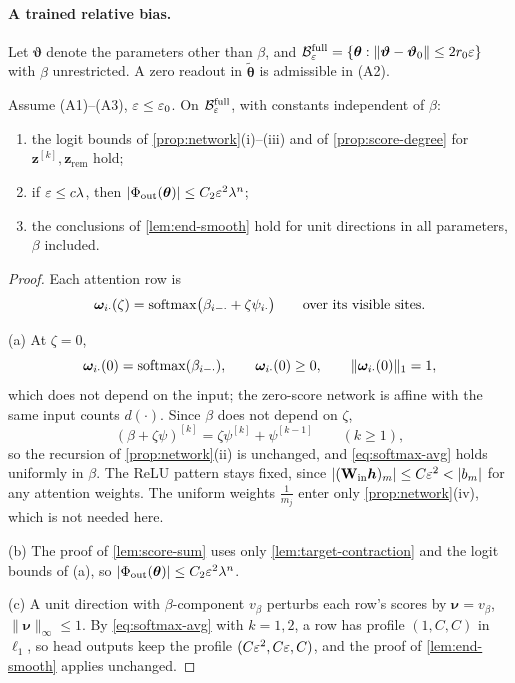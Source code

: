 \paragraph{A trained relative bias.} Let $\bm\vartheta$ denote the parameters other than $\beta$, and
$\mathcal B^{\mathrm{full}}_{\varepsilon}=\{\bm\theta:\|\bm\vartheta-\bm\vartheta_0\|\le2r_0\varepsilon\}$ with $\beta$ unrestricted. A zero readout in $\tilde{\bm\theta}$ is admissible in (A2).

\begin{lemma}
\label{lem:bias-uniform}
Assume (A1)--(A3), $\varepsilon\le\varepsilon_0$. On $\mathcal B^{\mathrm{full}}_{\varepsilon}$, with constants independent of $\beta$:
\begin{enumerate}[label=(\alph*),leftmargin=*,itemsep=1pt,topsep=2pt]
\item the logit bounds of \cref{prop:network}(i)--(iii) and of \cref{prop:score-degree} for $\bm z^{[k]},\bm z_{\mathrm{rem}}$ hold;
\item if $\varepsilon\le c\lambda$, then $|\Phi_{\mathrm{out}}(\bm\theta)|\le C_2\varepsilon^2\lambda^n$;
\item the conclusions of \cref{lem:end-smooth} hold for unit directions in all parameters, $\beta$ included.
\end{enumerate}
\end{lemma}

\begin{proof}
Each attention row is
\[
 \bm\omega_{i\cdot}(\zeta)=\operatorname{softmax}\bigl(\beta_{i-\cdot}+\zeta\psi_{i\cdot}\bigr)\qquad\text{over its visible sites.}
\]

\noindent(a) At $\zeta=0$,
\[
 \bm\omega_{i\cdot}(0)=\operatorname{softmax}(\beta_{i-\cdot}),\qquad \bm\omega_{i\cdot}(0)\ge0,\qquad \|\bm\omega_{i\cdot}(0)\|_1=1,
\]
which does not depend on the input; the zero-score network is affine with the same input counts $d(\cdot)$. Since $\beta$ does not
depend on $\zeta$,
\[
 (\beta+\zeta\psi)^{[k]}=\zeta\psi^{[k]}+\psi^{[k-1]}\qquad(k\ge1),
\]
so the recursion of \cref{prop:network}(ii) is unchanged, and \cref{eq:softmax-avg} holds uniformly in $\beta$. The ReLU pattern stays
fixed, since $|(\mathbf W_{\mathrm{in}}\bm h)_m|\le C\initscale^2<|b_m|$ for any attention weights. The uniform weights $\frac{1}{m_j}$ enter only
\cref{prop:network}(iv), which is not needed here.

\smallskip\noindent(b) The proof of \cref{lem:score-sum} uses only \cref{lem:target-contraction} and the logit bounds of (a), so
$|\Phi_{\mathrm{out}}(\bm\theta)|\le C_2\varepsilon^2\lambda^n$.

\smallskip\noindent(c) A unit direction with $\beta$-component $v_\beta$ perturbs each row's scores by $\bm\nu=v_\beta$, $\|\bm\nu\|_\infty\le1$. By
\cref{eq:softmax-avg} with $k=1,2$, a row has profile $(1,C,C)$ in $\ell_1$, so head outputs keep the profile $(C\varepsilon^2,C\varepsilon,C)$, and the
proof of \cref{lem:end-smooth} applies unchanged.
\end{proof}

